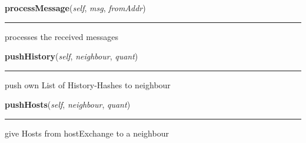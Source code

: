     \label{peer:Peer:processMessage}

    \vspace{0.5ex}

\hspace{.8\funcindent}\begin{boxedminipage}{\funcwidth}

    \raggedright \textbf{processMessage}(\textit{self}, \textit{msg}, \textit{fromAddr})

    \vspace{-1.5ex}

    \rule{\textwidth}{0.5\fboxrule}
\setlength{\parskip}{2ex}
    processes the received messages

\setlength{\parskip}{1ex}
    \end{boxedminipage}

    \label{peer:Peer:pushHistory}

    \vspace{0.5ex}

\hspace{.8\funcindent}\begin{boxedminipage}{\funcwidth}

    \raggedright \textbf{pushHistory}(\textit{self}, \textit{neighbour}, \textit{quant})

    \vspace{-1.5ex}

    \rule{\textwidth}{0.5\fboxrule}
\setlength{\parskip}{2ex}
    push own List of History-Hashes to neighbour

\setlength{\parskip}{1ex}
    \end{boxedminipage}

    \label{peer:Peer:pushHosts}

    \vspace{0.5ex}

\hspace{.8\funcindent}\begin{boxedminipage}{\funcwidth}

    \raggedright \textbf{pushHosts}(\textit{self}, \textit{neighbour}, \textit{quant})

    \vspace{-1.5ex}

    \rule{\textwidth}{0.5\fboxrule}
\setlength{\parskip}{2ex}
    give Hosts from hostExchange to a neighbour

\setlength{\parskip}{1ex}
    \end{boxedminipage}

